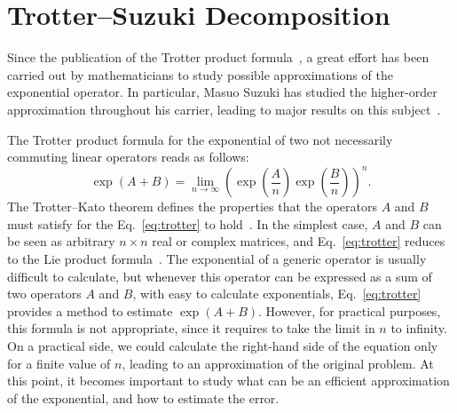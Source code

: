 \chapter{Trotter--Suzuki Decomposition}
Since the publication of the Trotter product formula~\cite{trotter1959product}, a great effort has been carried out by mathematicians to study possible approximations of the exponential operator. In particular, Masuo Suzuki has studied the higher-order approximation throughout his carrier, leading to major results on this subject~\cite{suzuki1985decomposition,suzuki1990fractal,Suzuki1992387, suzuki1994quantum,Suzuki1995425,suzuki1997algebraic,Suzuki200032}.

The Trotter product formula for the exponential of two not necessarily commuting linear operators reads as follows:
\begin{equation} \label{eq:trotter}
\exp{(A+B)} = \lim_{n\rightarrow\infty} \left(\exp\left({\frac{A}{n}}\right) \exp{\left(\frac{B}{n}\right)}\right)^n.
\end{equation}
The Trotter--Kato theorem defines the properties that the operators $A$ and $B$ must satisfy for the Eq.~\eqref{eq:trotter} to hold~\cite{KatoTosio1978}. In the simplest case, $A$ and $B$ can be seen as arbitrary $n\times n$ real or complex matrices, and  Eq.~\eqref{eq:trotter} reduces to the Lie product formula~\cite{SophusLie1888}. The exponential of a generic operator is usually difficult to calculate, but whenever this operator can be expressed as a sum of two operators $A$ and $B$, with easy to calculate exponentials, Eq.~\eqref{eq:trotter} provides a method to estimate $\exp{(A+B)}$. However, for practical purposes, this formula is not appropriate, since it requires to take the limit in $n$ to infinity. On a practical side, we could calculate the right-hand side of the equation only for a finite value of $n$, leading to an approximation of the original problem. At this point, it becomes important to study what can be an efficient approximation of the exponential, and how to estimate the error.

